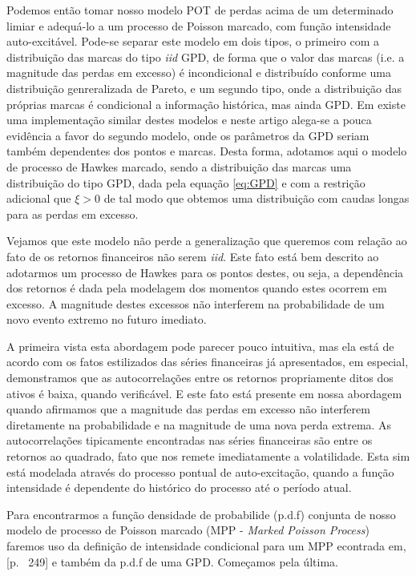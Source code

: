 \documentclass[review]{elsarticle}
\theoremstyle{definition}
\begin{document}
Podemos então tomar nosso modelo POT de perdas acima de um determinado limiar e adequá-lo a um processo de Poisson marcado, com função intensidade auto-excitável. Pode-se separar este modelo em dois tipos, o primeiro com a distribuição das marcas do tipo \emph{iid} GPD, de forma que o valor das marcas (i.e. a magnitude das perdas em excesso) é incondicional e distribuído conforme uma distribuição genreralizada de Pareto, e um segundo tipo, onde a distribuição das próprias marcas é condicional a informação histórica, mas ainda GPD. Em \cite{ChavezDemoulin2005} existe uma implementação similar destes modelos e neste artigo alega-se a pouca evidência a favor do segundo modelo, onde os parâmetros da GPD seriam também dependentes dos pontos e marcas. Desta forma, adotamos aqui o modelo de processo de Hawkes marcado, sendo a distribuição das marcas uma distribuição do tipo GPD, dada pela equação \eqref{eq:GPD} e com a restrição adicional que $\xi>0$ de tal modo que obtemos uma distribuição com caudas longas para as perdas em excesso.

Vejamos que este modelo não perde a generalização que queremos com relação ao fato de os retornos financeiros não serem \emph{iid}. Este fato está bem descrito ao adotarmos um processo de Hawkes para os pontos destes, ou seja, a dependência dos retornos é dada pela modelagem dos momentos quando estes ocorrem em excesso. A magnitude destes excessos não interferem na probabilidade de um novo evento extremo no futuro imediato. 

A primeira vista esta abordagem pode parecer pouco intuitiva, mas ela está de acordo com os fatos estilizados das séries financeiras já apresentados, em especial, demonstramos que as autocorrelações entre os retornos propriamente ditos dos ativos é baixa, quando verificável. E este fato está presente em nossa abordagem quando afirmamos que a magnitude das perdas em excesso não interferem diretamente na probabilidade e na magnitude de uma nova perda extrema. As autocorrelações tipicamente encontradas nas séries financeiras são entre os retornos ao quadrado, fato que nos remete imediatamente a volatilidade. Esta sim está modelada através do processo pontual de auto-excitação, quando a função intensidade é dependente do histórico do processo até o período atual.

Para encontrarmos a função densidade de probabilide (p.d.f) conjunta de nosso modelo de processo de Poisson marcado (MPP - \emph{Marked Poisson Process}) faremos uso da definição de intensidade condicional para um MPP econtrada em, \cite{Daley2003}[p. ~249] e também da p.d.f de uma GPD. Começamos pela última.
\end{document}
